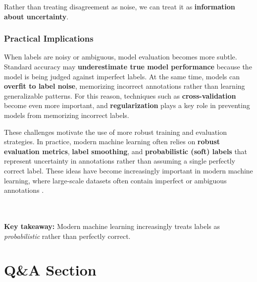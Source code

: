 \documentclass{article}
\begin{document}
Rather than treating disagreement as noise, we can treat it as 
\textbf{information about uncertainty}.

\subsubsection{Practical Implications}

When labels are noisy or ambiguous, model evaluation becomes more subtle. 
Standard accuracy may \textbf{underestimate true model performance} because the 
model is being judged against imperfect labels. At the same time, models can 
\textbf{overfit to label noise}, memorizing incorrect annotations rather than 
learning generalizable patterns. For this reason, techniques such as 
\textbf{cross-validation} become even more important, and 
\textbf{regularization} plays a key role in preventing models from memorizing 
incorrect labels.

These challenges motivate the use of more robust training and evaluation 
strategies. In practice, modern machine learning often relies on 
\textbf{robust evaluation metrics}, \textbf{label smoothing}, and 
\textbf{probabilistic (soft) labels} that represent uncertainty in annotations 
rather than assuming a single perfectly correct label. These ideas have become increasingly important in modern machine learning,
where large-scale datasets often contain imperfect or ambiguous annotations
\cite{Quesada2025Largescale, cifar10h}.

\\ \\
\noindent
\textbf{Key takeaway:} Modern machine learning increasingly treats labels as 
\textit{probabilistic} rather than perfectly correct.


\section{Q\&A Section}
\end{document}
